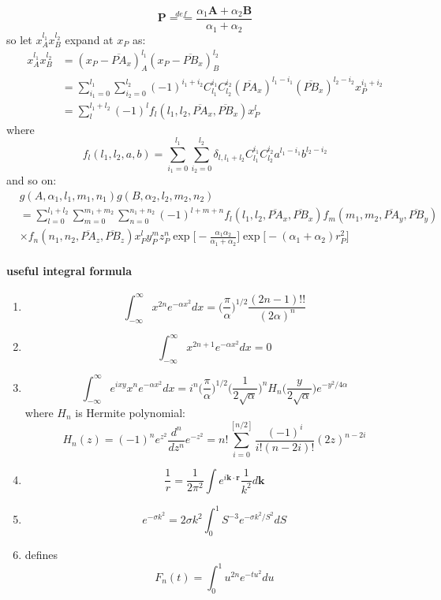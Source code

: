 \documentclass[11pt]{article}
\providecommand{\tightlist}{%
      \setlength{\itemsep}{0pt}\setlength{\parskip}{0pt}}
\begin{document}
\[ \mathbf{P} \overset{def}{==} \frac{\alpha_1 \mathbf{A} + \alpha_2 \mathbf{B}}{\alpha_1+\alpha_2}\]
so let \(x_A^{l_1}x_B^{l_2}\) expand at \(x_P\) as:
\begin{align*}
x_A^{l_1}x_B^{l_2} &= (x_P - \overline{PA}_x)_A^{l_1} (x_P - \overline{PB}_x)_B^{l_2} 
\\
&= \sum_{i_1=0}^{l_1} \sum_{i_2=0}^{l_2} (-1)^{i_1+i_2} C_{l_1}^{i_1}C_{l_2}^{i_2} (\overline{PA}_x)^{l_1-i_1} (\overline{PB}_x)^{l_2-i_2} x_P^{i_1+i_2} 
\\
&= \sum_l^{l_1+l_2} (-1)^{l} f_l (l_1,l_2,\overline{PA}_x, \overline{PB}_x) x_P^l
\end{align*}
where
\[ 
f_l(l_1,l_2,a,b) = \sum_{i_1=0}^{l_1} \sum_{i_2=0}^{l_2} \delta_{l,l_1+l_2} C_{l_1}^{i_1}C_{l_2}^{i_2} a^{l_1-i_1} b^{l_2-i_2} 
\]
and so on:\\
\begin{align*}
&g(A,\alpha_1,l_1,m_1,n_1)g(B,\alpha_2,l_2,m_2,n_2) 
\\&= \sum_{l=0}^{l_1+l_2}\sum_{m=0}^{m_1+m_2}\sum_{n=0}^{n_1+n_2}
(-1)^{l+m+n} f_l (l_1,l_2,\overline{PA}_x, \overline{PB}_x)
f_m (m_1,m_2,\overline{PA}_y, \overline{PB}_y)
\\
&\times
f_n (n_1,n_2,\overline{PA}_z, \overline{PB}_z)
x_P^l y_P^m z_P^n 
\exp\big[-\frac{\alpha_1\alpha_2}{\alpha_1+\alpha_2}\big]\exp\big[-(\alpha_1+\alpha_2)r_P^2 \big]
\end{align*}

    \paragraph{useful integral formula}\label{useful-integral-formula}

\begin{enumerate}
\def\labelenumi{\arabic{enumi}.}
\tightlist
\item
  \[ \int_{-\infty}^{\infty} x^{2n}e^{-\alpha x^2}dx = \big(\frac{\pi}{\alpha}\big)^{1/2}
  \frac{(2n-1)!!}{(2\alpha)^n}
  \]
\item
  \[
  \int_{-\infty}^{\infty} x^{2n+1}e^{-\alpha x^2}dx = 0
  \]
\item
  \[
  \int_{-\infty}^{\infty} e^{ixy}x^{n}e^{-\alpha x^2}dx = i^n \big(\frac{\pi}{\alpha}\big)^{1/2}\big(\frac{1}{2\sqrt{\alpha}}\big)^n H_n\big(\frac{y}{2\sqrt{\alpha}}\big) e^{-y^2/4\alpha}
  \] where \(H_n\) is Hermite polynomial:\\
  \[
  H_n(z) = (-1)^n e^{z^2} \frac{d^n}{dz^n} e^{-z^2}
  = n!\sum_{i=0}^{[n/2]}\frac{(-1)^i}{i!(n-2i)!}(2z)^{n-2i}
  \]
\item
  \[
  \frac{1}{r} = \frac{1}{2\pi^2} \int e^{i\mathbf{k}\cdot\mathbf{r}}\frac{1}{k^2} d\mathbf{k}
  \]
\item
  \[
  e^{-\sigma k^2} = 2\sigma k^2 \int_0^1 S^{-3} e^{-\sigma k^2/S^2} dS
  \]
\item
  defines \[
  F_n (t) = \int_0^1 u^{2n} e^{-t u^2} du
  \]
\end{enumerate}
\end{document}
